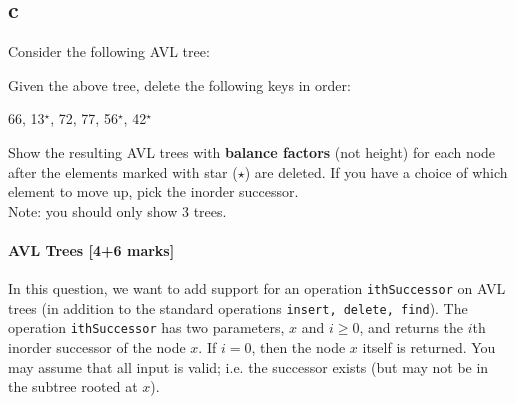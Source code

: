 \documentclass[12pt]{article}
\begin{document}
\begin{enumerate}
		\part{c}  Consider the following AVL tree:
		\begin{center}
		\end{center}
		
		Given the above tree, delete the following keys in order:
		
		\begin{center}
			66, 13$^\star$, 72, 77, 56$^\star$, 42$^\star$ 
		\end{center}
		
		Show the resulting AVL trees with {\bf balance factors} (not height) for each node after the elements marked with star ($\star$) are deleted.  
		If you have a choice of which element to move up, pick the inorder successor. \\
		Note: you should only show 3 trees.
		
	\end{enumerate}
	
	\subsection{AVL Trees [4+6 marks]}
	
	In this question, we want to add support for an operation {\tt ithSuccessor} on AVL trees (in addition to the standard operations {\tt insert, delete, find}).
	The operation {\tt ithSuccessor} has two parameters, $x$ and $i \ge 0$, and returns the $i$th inorder successor of the node $x$.
	If $i = 0$, then the node $x$ itself is returned.
	You may assume that all input is valid; i.e. the successor exists (but may not be in the subtree rooted at $x$).
	
\end{document}
